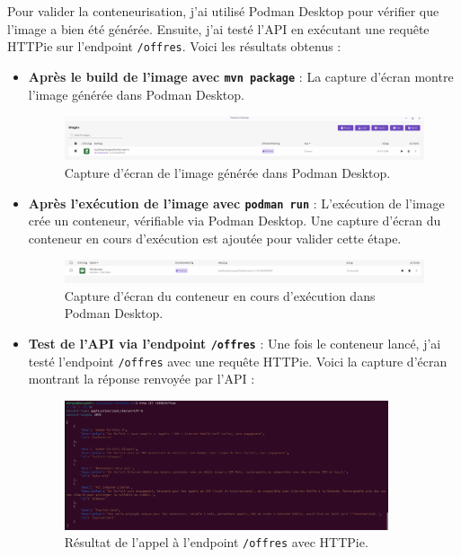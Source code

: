 \documentclass{article}
\begin{document}
	Pour valider la conteneurisation, j'ai utilisé Podman Desktop pour vérifier que l'image a bien été générée. Ensuite, j'ai testé l'API en exécutant une requête HTTPie sur l'endpoint \texttt{/offres}. Voici les résultats obtenus :
	\newpage
	\begin{itemize}
		\item \textbf{Après le build de l'image avec \texttt{mvn package}} : La capture d'écran montre l'image générée dans Podman Desktop.
		\begin{figure}[h!]
			\centering
			\includegraphics[width=1\textwidth]{asset/image_podman.png}
			\caption{Capture d'écran de l'image générée dans Podman Desktop.}
			\label{fig:image_podman}
		\end{figure}
		
		\item \textbf{Après l'exécution de l'image avec \texttt{podman run}} : L'exécution de l'image crée un conteneur, vérifiable via Podman Desktop. Une capture d'écran du conteneur en cours d'exécution est ajoutée pour valider cette étape.
		\begin{figure}[h!]
			\centering
			\includegraphics[width=1\textwidth]{asset/conteneur_podman.png}
			\caption{Capture d'écran du conteneur en cours d'exécution dans Podman Desktop.}
			\label{fig:conteneur_podman}
		\end{figure}
		
		\item \textbf{Test de l'API via l'endpoint \texttt{/offres}} : Une fois le conteneur lancé, j'ai testé l'endpoint \texttt{/offres} avec une requête HTTPie. Voici la capture d'écran montrant la réponse renvoyée par l'API :
		\begin{figure}[h!]
			\centering
			\includegraphics[width=0.9\textwidth]{asset/appel_api_conteneur.png}
			\caption{Résultat de l'appel à l'endpoint \texttt{/offres} avec HTTPie.}
			\label{fig:appel_api_conteneur}
		\end{figure}
	\end{itemize}
	
\end{document}
